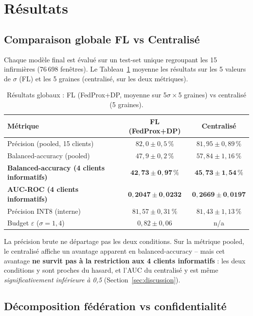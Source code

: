 \documentclass{acmart}
\begin{document}
\section{Résultats}
\label{sec:results}

\subsection{Comparaison globale FL vs Centralisé}

Chaque modèle final est évalué sur un test-set unique regroupant les 15 infirmières
(76\,698 fenêtres). Le Tableau~\ref{tab:main} moyenne les résultats sur les 5 valeurs
de $\sigma$ (FL) et les 5 graines (centralisé, sur les deux métriques).

\begin{table}[h!]
\centering
\small
\caption{Résultats globaux : FL (FedProx+DP, moyenne sur 5$\sigma\times$5 graines) vs
centralisé (5 graines).}
\label{tab:main}
\begin{tabular}{lcc}
\toprule
Métrique & FL (FedProx+DP) & Centralisé \\
\midrule
Précision (pooled, 15 clients)             & $82{,}0\pm0{,}5\,\%$  & $81{,}95\pm0{,}89\,\%$ \\
Balanced-accuracy (pooled)                  & $47{,}9\pm0{,}2\,\%$  & $57{,}84\pm1{,}16\,\%$ \\
\textbf{Balanced-accuracy (4 clients informatifs)}  & $\mathbf{42{,}73\pm0{,}97\,\%}$ & $\mathbf{45{,}73\pm1{,}54\,\%}$ \\
\textbf{AUC-ROC (4 clients informatifs)}    & $\mathbf{0{,}2047\pm0{,}0232}$ & $\mathbf{0{,}2669\pm0{,}0197}$ \\
Précision INT8 (interne)                    & $81{,}57\pm0{,}31\,\%$ & $81{,}43\pm1{,}13\,\%$ \\
Budget $\varepsilon$ ($\sigma=1{,}4$)       & $0{,}82\pm0{,}06$      & n/a \\
\bottomrule
\end{tabular}
\end{table}

La précision brute ne départage pas les deux conditions. Sur la métrique pooled, le
centralisé affiche un avantage apparent en balanced-accuracy -- mais cet avantage
\textbf{ne survit pas à la restriction aux 4 clients informatifs} : les deux
conditions y sont proches du hasard, et l'AUC du centralisé y est même
\emph{significativement inférieure à 0,5} (Section~\ref{sec:discussion}).

\subsection{Décomposition fédération vs confidentialité}
\end{document}
